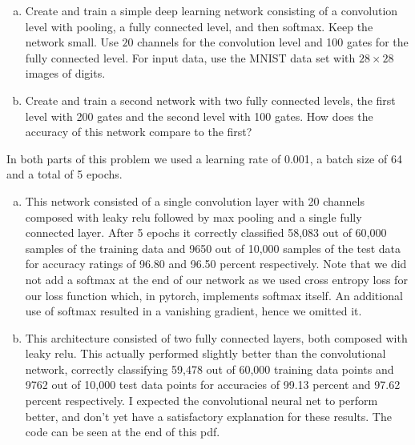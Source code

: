 \begin{homework}[e]
\begin{enumerate}[(a)]
      \item Create and train a simple deep learning network consisting of a convolution level with pooling, a fully connected level, and then softmax. Keep the network small. Use $20$ channels for the convolution level and 100 gates for the fully connected level. For input data, use the MNIST data set with $28\times 28$ images of digits.
      \item Create and train a second network with two fully connected levels, the first level with 200 gates and the second level with 100 gates. How does the accuracy of this network compare to the first?
    \end{enumerate}
    \begin{prf} In both parts of this problem we used a learning rate of 0.001, a batch size of 64 and a total of 5 epochs.
      \begin{enumerate}[(a)]
        \item This network consisted of a single convolution layer with 20 channels composed with leaky relu followed by max pooling and a single fully connected layer. After 5 epochs it correctly classified 58,083 out of 60,000 samples of the training data and 9650 out of 10,000 samples of the test data for accuracy ratings of 96.80 and 96.50 percent respectively. Note that we did not add a softmax at the end of our network as we used cross entropy loss for our loss function which, in pytorch, implements softmax itself. An additional use of softmax resulted in a vanishing gradient, hence we omitted it.
        \item This architecture consisted of two fully connected layers, both composed with leaky relu. This actually performed slightly better than the convolutional network, correctly classifying 59,478 out of 60,000 training data points and 9762 out of 10,000 test data points for accuracies of 99.13 percent and 97.62 percent respectively. I expected the convolutional neural net to perform better, and don't yet have a satisfactory explanation for these results. The code can be seen at the end of this pdf.
      \end{enumerate}
    \end{prf}



\end{homework}
